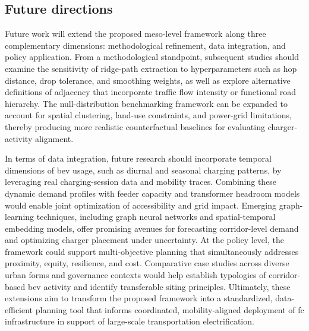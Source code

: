 \subsection{Future directions}
Future work will extend the proposed meso-level framework along three complementary dimensions: methodological refinement, data integration, and policy application.
From a methodological standpoint, subsequent studies should examine the sensitivity of ridge-path extraction to hyperparameters such as hop distance, drop tolerance, and smoothing weights, as well as explore alternative definitions of adjacency that incorporate traffic flow intensity or functional road hierarchy. The null-distribution benchmarking framework can be expanded to account for spatial clustering, land-use constraints, and power-grid limitations, thereby producing more realistic counterfactual baselines for evaluating charger-activity alignment.

In terms of data integration, future research should incorporate temporal dimensions of \gls{bev} usage, such as diurnal and seasonal charging patterns, by leveraging real charging-session data and mobility traces. Combining these dynamic demand profiles with feeder capacity and transformer headroom models would enable joint optimization of accessibility and grid impact. Emerging graph-learning techniques, including graph neural networks and spatial-temporal embedding models, offer promising avenues for forecasting corridor-level demand and optimizing charger placement under uncertainty.
At the policy level, the framework could support multi-objective planning that simultaneously addresses proximity, equity, resilience, and cost. Comparative case studies across diverse urban forms and governance contexts would help establish typologies of corridor-based \gls{bev} activity and identify transferable siting principles. Ultimately, these extensions aim to transform the proposed framework into a standardized, data-efficient planning tool that informs coordinated, mobility-aligned deployment of \gls{fc} infrastructure in support of large-scale transportation electrification.


